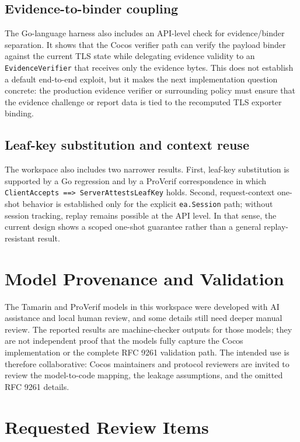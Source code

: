 \documentclass[11pt,a4paper]{article}
\begin{document}
\subsection{Evidence-to-binder coupling}

The Go-language harness also includes an API-level check for evidence/binder
separation. It shows that the Cocos verifier path can verify the payload binder
against the current TLS state while delegating evidence validity to an
\texttt{EvidenceVerifier} that receives only the evidence bytes. This does not
establish a default end-to-end exploit, but it makes the next implementation
question concrete: the production evidence verifier or surrounding policy must
ensure that the evidence challenge or report data is tied to the recomputed
TLS exporter binding.

\subsection{Leaf-key substitution and context reuse}

The workspace also includes two narrower results. First, leaf-key substitution
is supported by a Go regression and by a ProVerif correspondence in which
\texttt{ClientAccepts ==> ServerAttestsLeafKey} holds. Second, request-context
one-shot behavior is established only for the explicit \texttt{ea.Session}
path; without session tracking, replay remains possible at the API level. In
that sense, the current design shows a scoped one-shot guarantee rather than a
general replay-resistant result.

\section{Model Provenance and Validation}

The Tamarin and ProVerif models in this workspace were developed with AI
assistance and local human review, and some details still need deeper manual
review. The reported results are machine-checker outputs for those models; they
are not independent proof that the models fully capture the Cocos
implementation or the complete RFC 9261 validation path. The intended use is
therefore collaborative: Cocos maintainers and protocol reviewers are invited
to review the model-to-code mapping, the leakage assumptions, and the omitted
RFC 9261 details.

\section{Requested Review Items}
\end{document}
